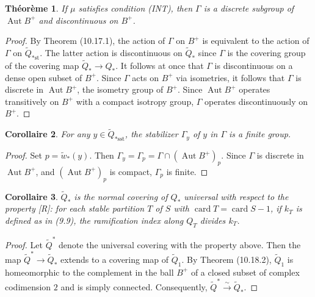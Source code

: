 \documentclass[12pt,a4paper]{article}
\theoremstyle{plain}
\newtheorem{theorem}{Th\'eor\`eme}[section]
\newtheorem{corollary}[theorem]{Corollaire}
\theoremstyle{definition}
\theoremstyle{remark}
\DeclareMathOperator{\Aut}{Aut}
\DeclareMathOperator{\card}{card}
\begin{document}
\begin{theorem}
\label{10.19}
If $\mu$ satisfies condition (INT), then $\Gamma$ is a discrete subgroup of $\Aut B^+$ and discontinuous on $B^+$.
\end{theorem}

\begin{proof}
By Theorem (10.17.1), the action of $\Gamma$ on $B^+$ is equivalent to the action of $\Gamma$ on $\widetilde{Q}_{*\text{st}}$. The latter action is discontinuous on $\widetilde{Q}_*$ since $\Gamma$ is the covering group of the covering map $\widetilde{Q}_* \to Q_*$. It follows at once that $\Gamma$ is discontinuous on a dense open subset of $B^+$. Since $\Gamma$ acts on $B^+$ via isometries, it follows that $\Gamma$ is discrete in $\Aut B^+$, the isometry group of $B^+$. Since $\Aut B^+$ operates transitively on $B^+$ with a compact isotropy group, $\Gamma$ operates discontinuously on $B^+$.
\end{proof}

\begin{corollary}
\label{10.19.1}
For any $y \in \widetilde{Q}_{*\text{sst}}$, the stabilizer $\Gamma_y$ of $y$ in $\Gamma$ is a finite group.
\end{corollary}

\begin{proof}
Set $p = \widetilde{w}_*(y)$. Then $\Gamma_y = \Gamma_p = \Gamma \cap (\Aut B^+)_p$. Since $\Gamma$ is discrete in $\Aut B^+$, and $(\Aut B^+)_p$ is compact, $\Gamma_p$ is finite.
\end{proof}

\begin{corollary}
\label{10.19.2}
$\widetilde{Q}_*$ is the normal covering of $Q_*$ universal with respect to the property [R]: for each stable partition $T$ of $S$ with $\card T = \card S - 1$, if $k_T$ is defined as in (9.9), the ramification index along $Q_T$ divides $k_T$.
\end{corollary}

\begin{proof}
Let $\widetilde{Q}^*$ denote the universal covering with the property above. Then the map $\widetilde{Q}^* \to \widetilde{Q}_*$ extends to a covering map of $\widetilde{Q}_1$. By Theorem (10.18.2), $\widetilde{Q}_1$ is homeomorphic to the complement in the ball $B^+$ of a closed subset of complex codimension $2$ and is simply connected. Consequently, $\widetilde{Q}^* \xrightarrow{\sim} \widetilde{Q}_*$.
\end{proof}
\end{document}
